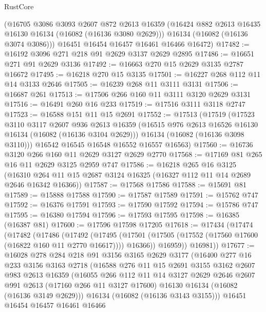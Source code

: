 \begin{lexlean}{RustCore}
\begin{coremodule}
      (@16705
        @3086
        @3093
        @2607
        @872
        @2613
        @16359
        (@16424 @882 @2613 @16435 @16130 @16134 (@16082 (@16136 @3080 @2629)))
        @16134
        (@16082 (@16136 @3074 @3086)))
      @16451
      @16454
      @16457
      @16461
      @16466
      @16472)
@17482 := @16192 @3096 @271 @218 @91 @2629 @3137 @2629 @2895
@17486 := @16651 @271 @91 @2629 @3136
@17492 := @16663 @270 @15 @2629 @3135 @2787 @16672
@17495 := @16218 @270 @15 @3135
@17501 := @16227 @268 @112 @11 @14 @3133 @2646
@17505 := @16239 @268 @11 @3111 @3131
@17506 := @16687 @261
@17513 := @17506 @266 @160 @11 @3111 @3120 @2629 @3131
@17516 := @16491 @260 @16 @233
@17519 := @17516 @3111 @3118 @2747
@17523 := @16588 @151 @11 @15 @2691
@17552 := @17513
    (@17519
      (@17523
        @3110
        @3117
        @2607
        @936
        @2613
        @16359
        (@16515 @976 @2613 @16526 @16130 @16134 (@16082 (@16136 @3104 @2629)))
        @16134
        (@16082 (@16136 @3098 @3110)))
      @16542
      @16545
      @16548
      @16552
      @16557
      @16563)
@17560 := @16736 @3120 @266 @160 @11 @2629 @3127 @2629 @2770
@17568 := @17169 @81 @265 @16 @11 @2629 @3125 @2959 @747
@17586 := @16218
    @265
    @16
    @3125
    (@16310 @264 @11 @15 @2687 @3124 @16325 (@16327 @112 @11 @14 @2689 @2646 @16342 @16366))
@17587 := @17568 @17586
@17588 := @15691 @81
@17589 := @15888 @17588
@17590 := @17587 @17589
@17591 := @15762 @747
@17592 := @16376 @17591
@17593 := @17590 @17592
@17594 := @15786 @747
@17595 := @16380 @17594
@17596 := @17593 @17595
@17598 := @16385 (@16387 @81)
@17600 := @17596 @17598 @17205
@17618 := @17434
    (@17474
      (@17482
        (@17486
          (@17492
            (@17495
              (@17501 (@17505 (@17552 (@17560 @17600 (@16822 @160 @11 @2770 @16617)))) @16366))
            @16959))
        @16981))
@17677 := @16028
    @278
    @284
    @218
    @91
    @3156
    @3165
    @2629
    @3177
    (@16400
      @277
      @16
      @233
      @3156
      @3163
      @2718
      (@16588
        @276
        @11
        @15
        @2691
        @3155
        @3162
        @2607
        @983
        @2613
        @16359
        (@16055
          @266
          @112
          @11
          @14
          @3127
          @2629
          @2646
          @2607
          @991
          @2613
          (@17160 @266 @11 @3127 @17600)
          @16130
          @16134
          (@16082 (@16136 @3149 @2629)))
        @16134
        (@16082 (@16136 @3143 @3155)))
      @16451
      @16454
      @16457
      @16461
      @16466

\end{coremodule}
\end{lexlean}
